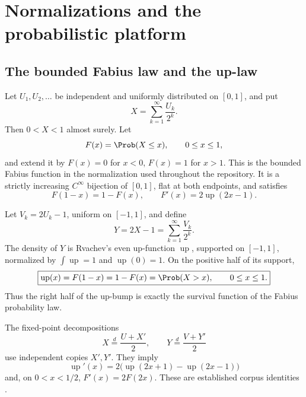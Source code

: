 \documentclass[11pt,oneside]{article}
\theoremstyle{definition}
\theoremstyle{remark}
\newcommand{\Up}{\operatorname{up}}
\newcommand{\1}{\mathbf 1}
\begin{document}
\section{Normalizations and the probabilistic platform}
\label{p8:sec:platform}

\subsection{The bounded Fabius law and the up-law}

Let \(U_1,U_2,\ldots\) be independent and uniformly distributed on \([0,1]\), and
put
\begin{equation}
 X=\sum_{k=1}^{\infty}\frac{U_k}{2^k}.
 \label{p8:eq:Xdef}
\end{equation}
Then \(0<X<1\) almost surely.  Let
\begin{equation}
 F(x)=\Prob(X\le x),\qquad 0\le x\le1,
 \label{p8:eq:Fcdf}
\end{equation}
and extend it by \(F(x)=0\) for \(x<0\), \(F(x)=1\) for \(x>1\).
This is the bounded Fabius function in the normalization used throughout the
repository.  It is a strictly increasing \(C^\infty\) bijection of \([0,1]\),
flat at both endpoints, and satisfies
\begin{equation}
 F(1-x)=1-F(x),
 \qquad
 F'(x)=2\Up(2x-1).
 \label{p8:eq:Fuprelations}
\end{equation}

Let \(V_k=2U_k-1\), uniform on \([-1,1]\), and define
\begin{equation}
 Y=2X-1=\sum_{k=1}^{\infty}\frac{V_k}{2^k}.
 \label{p8:eq:Ydef}
\end{equation}
The density of \(Y\) is Rvachev's even up-function \(\Up\), supported on
\([-1,1]\), normalized by \(\int\Up=1\) and \(\Up(0)=1\).  On the positive half
of its support,
\begin{equation}
 \boxed{\Up(x)=F(1-x)=1-F(x)=\Prob(X>x),\qquad 0\le x\le1.}
 \label{p8:eq:up-survival}
\end{equation}
Thus the right half of the up-bump is exactly the survival function of the
Fabius probability law.

The fixed-point decompositions
\begin{equation}
 X\stackrel d=\frac{U+X'}2,
 \qquad
 Y\stackrel d=\frac{V+Y'}2
 \label{p8:eq:fixedpoints}
\end{equation}
use independent copies \(X',Y'\).  They imply
\begin{equation}
 \Up'(x)=2\bigl(\Up(2x+1)-\Up(2x-1)\bigr)
 \label{p8:eq:up-refinement}
\end{equation}
and, on \(0<x<1/2\), \(F'(x)=2F(2x)\).  These are established corpus
identities \cite{p8:proveitPrimary,p8:arias1982}.
\end{document}
